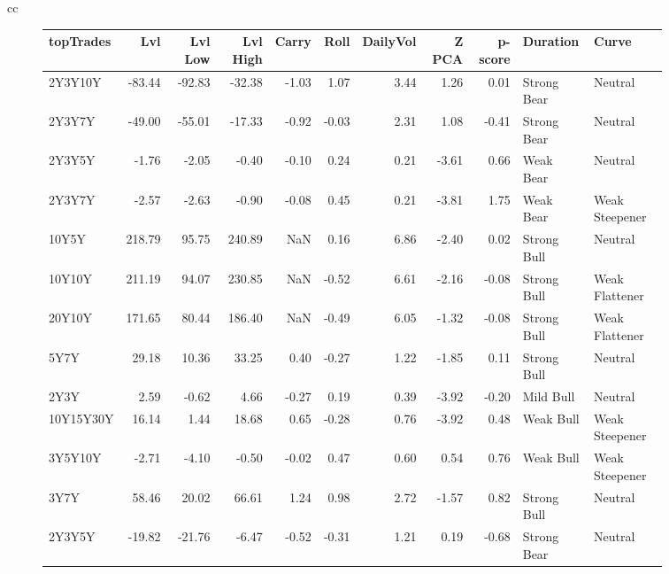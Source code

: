 \documentclass[a4paper,oneside]{report}
\begin{document}
\begin{figure}[htbp]
\begin{tabular}[c]{cc}
\begin{subfigure}[c]{0.5\textwidth}
\begin{adjustbox}{max width=\textwidth}
\begin{tabular}{lrrrrrrrrll}
\hline
 topTrades &     Lvl &  Lvl Low &  Lvl High &  Carry &  Roll &  DailyVol &  Z PCA &  p-score &     Duration &             Curve \\
\hline
   2Y3Y10Y &  -83.44 &   -92.83 &    -32.38 &  -1.03 &  1.07 &      3.44 &   1.26 &     0.01 &  Strong Bear &           Neutral \\
    2Y3Y7Y &  -49.00 &   -55.01 &    -17.33 &  -0.92 & -0.03 &      2.31 &   1.08 &    -0.41 &  Strong Bear &           Neutral \\
    2Y3Y5Y &   -1.76 &    -2.05 &     -0.40 &  -0.10 &  0.24 &      0.21 &  -3.61 &     0.66 &    Weak Bear &           Neutral \\
    2Y3Y7Y &   -2.57 &    -2.63 &     -0.90 &  -0.08 &  0.45 &      0.21 &  -3.81 &     1.75 &    Weak Bear &    Weak Steepener \\
     10Y5Y &  218.79 &    95.75 &    240.89 &    NaN &  0.16 &      6.86 &  -2.40 &     0.02 &  Strong Bull &           Neutral \\
    10Y10Y &  211.19 &    94.07 &    230.85 &    NaN & -0.52 &      6.61 &  -2.16 &    -0.08 &  Strong Bull &    Weak Flattener \\
    20Y10Y &  171.65 &    80.44 &    186.40 &    NaN & -0.49 &      6.05 &  -1.32 &    -0.08 &  Strong Bull &    Weak Flattener \\
      5Y7Y &   29.18 &    10.36 &     33.25 &   0.40 & -0.27 &      1.22 &  -1.85 &     0.11 &  Strong Bull &           Neutral \\
      2Y3Y &    2.59 &    -0.62 &      4.66 &  -0.27 &  0.19 &      0.39 &  -3.92 &    -0.20 &    Mild Bull &           Neutral \\
 10Y15Y30Y &   16.14 &     1.44 &     18.68 &   0.65 & -0.28 &      0.76 &  -3.92 &     0.48 &    Weak Bull &    Weak Steepener \\
   3Y5Y10Y &   -2.71 &    -4.10 &     -0.50 &  -0.02 &  0.47 &      0.60 &   0.54 &     0.76 &    Weak Bull &    Weak Steepener \\
      3Y7Y &   58.46 &    20.02 &     66.61 &   1.24 &  0.98 &      2.72 &  -1.57 &     0.82 &  Strong Bull &           Neutral \\
    2Y3Y5Y &  -19.82 &   -21.76 &     -6.47 &  -0.52 & -0.31 &      1.21 &   0.19 &    -0.68 &  Strong Bear &           Neutral \\

\end{tabular}
\end{adjustbox}
\end{subfigure}
\end{tabular}
\end{figure}
\end{document}
